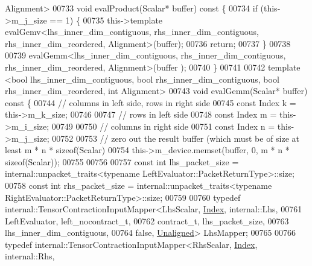 \begin{DoxyCode}
       Alignment>
00733   \textcolor{keywordtype}{void} evalProduct(Scalar* buffer)\textcolor{keyword}{ const }\{
00734     \textcolor{keywordflow}{if} (this->m\_j\_size == 1) \{
00735       this->\textcolor{keyword}{template} evalGemv<lhs\_inner\_dim\_contiguous, rhs\_inner\_dim\_contiguous, rhs\_inner\_dim\_reordered,
       Alignment>(buffer);
00736       \textcolor{keywordflow}{return};
00737     \}
00738 
00739     evalGemm<lhs\_inner\_dim\_contiguous, rhs\_inner\_dim\_contiguous, rhs\_inner\_dim\_reordered, Alignment>(buffer
      );
00740   \}
00741 
00742   \textcolor{keyword}{template} <\textcolor{keywordtype}{bool} lhs\_inner\_dim\_contiguous, \textcolor{keywordtype}{bool} rhs\_inner\_dim\_contiguous, \textcolor{keywordtype}{bool} rhs\_inner\_dim\_reordered, \textcolor{keywordtype}{int}
       Alignment>
00743   \textcolor{keywordtype}{void} evalGemm(Scalar* buffer)\textcolor{keyword}{ const }\{
00744     \textcolor{comment}{// columns in left side, rows in right side}
00745     \textcolor{keyword}{const} Index k = this->m\_k\_size;
00746 
00747     \textcolor{comment}{// rows in left side}
00748     \textcolor{keyword}{const} Index m = this->m\_i\_size;
00749 
00750     \textcolor{comment}{// columns in right side}
00751     \textcolor{keyword}{const} Index n = this->m\_j\_size;
00752 
00753     \textcolor{comment}{// zero out the result buffer (which must be of size at least m * n * sizeof(Scalar)}
00754     this->m\_device.memset(buffer, 0, m * n * \textcolor{keyword}{sizeof}(Scalar));
00755 
00756 
00757     \textcolor{keyword}{const} \textcolor{keywordtype}{int} lhs\_packet\_size = internal::unpacket\_traits<typename LeftEvaluator::PacketReturnType>::size;
00758     \textcolor{keyword}{const} \textcolor{keywordtype}{int} rhs\_packet\_size = internal::unpacket\_traits<typename RightEvaluator::PacketReturnType>::size;
00759 
00760     \textcolor{keyword}{typedef} internal::TensorContractionInputMapper<LhsScalar, \hyperlink{namespace_eigen_a62e77e0933482dafde8fe197d9a2cfde}{Index}, internal::Lhs,
00761                                                    LeftEvaluator, left\_nocontract\_t,
00762                                                    contract\_t, lhs\_packet\_size,
00763                                                    lhs\_inner\_dim\_contiguous,
00764                                                    \textcolor{keyword}{false}, \hyperlink{group__enums_gga45fe06e29902b7a2773de05ba27b47a1ac935220b4c844108e183ebe30a4d5204}{Unaligned}> LhsMapper;
00765 
00766     \textcolor{keyword}{typedef} internal::TensorContractionInputMapper<RhsScalar, \hyperlink{namespace_eigen_a62e77e0933482dafde8fe197d9a2cfde}{Index}, internal::Rhs,

\end{DoxyCode}
